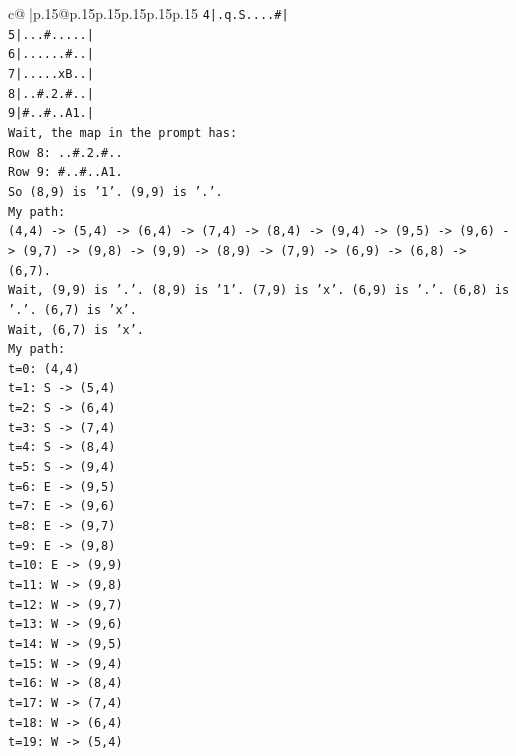 \documentclass{article}
\begin{document}
{\begin{supertabular}{c@{$\;$}|p{.15\linewidth}@{}p{.15\linewidth}p{.15\linewidth}p{.15\linewidth}p{.15\linewidth}p{.15\linewidth}}
{{{\texttt{4|.q.S....\#|} \\
\texttt{5|...\#.....|} \\
\texttt{6|......\#..|} \\
\texttt{7|.....xB..|} \\
\texttt{8|..\#.2.\#..|} \\
\texttt{9|\#..\#..A1.|} \\
\texttt{Wait, the map in the prompt has:} \\
\texttt{Row 8: ..\#.2.\#..} \\
\texttt{Row 9: \#..\#..A1.} \\
\texttt{So (8,9) is '1'. (9,9) is '.'.} \\
\texttt{My path:} \\
\texttt{(4,4) {-}> (5,4) {-}> (6,4) {-}> (7,4) {-}> (8,4) {-}> (9,4) {-}> (9,5) {-}> (9,6) {-}> (9,7) {-}> (9,8) {-}> (9,9) {-}> (8,9) {-}> (7,9) {-}> (6,9) {-}> (6,8) {-}> (6,7).} \\
\texttt{Wait, (9,9) is '.'. (8,9) is '1'. (7,9) is 'x'. (6,9) is '.'. (6,8) is '.'. (6,7) is 'x'.} \\
\texttt{Wait, (6,7) is 'x'.} \\
\texttt{My path:} \\
\texttt{t=0: (4,4)} \\
\texttt{t=1: S {-}> (5,4)} \\
\texttt{t=2: S {-}> (6,4)} \\
\texttt{t=3: S {-}> (7,4)} \\
\texttt{t=4: S {-}> (8,4)} \\
\texttt{t=5: S {-}> (9,4)} \\
\texttt{t=6: E {-}> (9,5)} \\
\texttt{t=7: E {-}> (9,6)} \\
\texttt{t=8: E {-}> (9,7)} \\
\texttt{t=9: E {-}> (9,8)} \\
\texttt{t=10: E {-}> (9,9)} \\
\texttt{t=11: W {-}> (9,8)} \\
\texttt{t=12: W {-}> (9,7)} \\
\texttt{t=13: W {-}> (9,6)} \\
\texttt{t=14: W {-}> (9,5)} \\
\texttt{t=15: W {-}> (9,4)} \\
\texttt{t=16: W {-}> (8,4)} \\
\texttt{t=17: W {-}> (7,4)} \\
\texttt{t=18: W {-}> (6,4)} \\
\texttt{t=19: W {-}> (5,4)} \\
}}}
\end{supertabular}}
\end{document}

